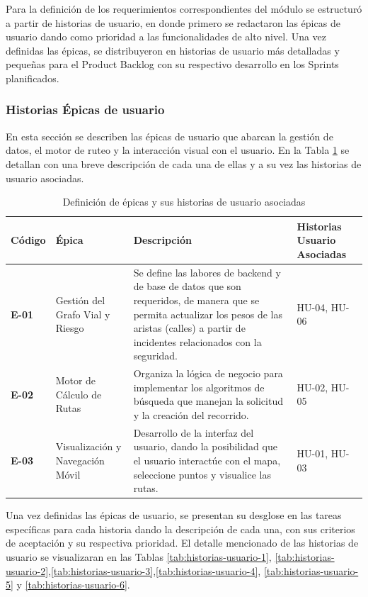 Para la definición de los requerimientos correspondientes del módulo se estructuró a partir de historias de usuario, en donde primero se redactaron las épicas de usuario dando como prioridad a las funcionalidades de alto nivel. Una vez definidas las épicas, se distribuyeron en historias de usuario más detalladas y pequeñas para el Product Backlog con su respectivo desarrollo en los Sprints planificados.

\subsubsection{Historias Épicas de usuario}

En esta sección se describen las épicas de usuario que abarcan la gestión de datos, el motor de ruteo y la interacción visual con el usuario. En la Tabla \ref{tab:epicas-usuario} se detallan con una breve descripción de cada una de ellas y a su vez las historias de usuario asociadas.

\begin{table}[H]
\caption{Definición de épicas y sus historias de usuario asociadas}
\label{tab:epicas-usuario}
\centering
\begin{tabular}{|p{1.5cm}|p{3cm}|p{5cm}|p{4cm}|}
\hline
\textbf{Código} & \textbf{Épica} & \textbf{Descripción} & \textbf{Historias Usuario Asociadas} \\ \hline

\textbf{E-01} 
& Gestión del Grafo Vial y Riesgo 
& Se define las labores de backend y de base de datos que son requeridos, de manera que se permita actualizar los pesos de las aristas (calles) a partir de incidentes relacionados con la seguridad. 
& HU-04, HU-06 \\ \hline

\textbf{E-02} 
& Motor de Cálculo de Rutas 
& Organiza la lógica de negocio para implementar los algoritmos de búsqueda que manejan la solicitud y la creación del recorrido. 
& HU-02, HU-05 \\ \hline

\textbf{E-03} 
& Visualización y Navegación Móvil 
& Desarrollo de la interfaz del usuario, dando la posibilidad que el usuario interactúe con el mapa, seleccione puntos y visualice las rutas. 
& HU-01, HU-03 \\ \hline

\end{tabular}
\end{table}

Una vez definidas las épicas de usuario, se presentan su desglose en las tareas específicas para cada historia dando la descripción de cada una, con sus criterios de aceptación y su respectiva prioridad. El detalle mencionado de las historias de usuario se visualizaran en las Tablas \ref{tab:historias-usuario-1}, \ref{tab:historias-usuario-2},\ref{tab:historias-usuario-3},\ref{tab:historias-usuario-4}, \ref{tab:historias-usuario-5} y \ref{tab:historias-usuario-6}.

